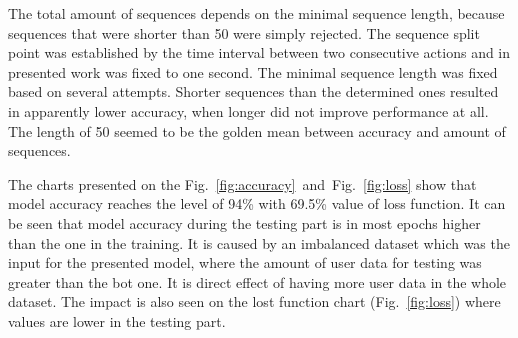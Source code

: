 The total amount of sequences depends on the minimal sequence length, because sequences that were shorter than \num{50} were simply rejected.
The sequence split point was established by the time interval between two consecutive actions and in presented work was fixed to one second.
The minimal sequence length was fixed based on several attempts.
Shorter sequences than the determined ones resulted in apparently lower accuracy, when longer did not improve performance at all.
The length of \num{50} seemed to be the golden mean between accuracy and amount of sequences.

The charts presented on the \mbox{Fig.~\ref{fig:accuracy} and Fig.~\ref{fig:loss}} show that model accuracy reaches the level of \num{94}\% with \num{69.5}\% value of loss function.
It can be seen that model accuracy during the testing part is in most epochs higher than the one in the training.
It is caused by an imbalanced dataset which was the input for the presented model, where
the amount of user data for testing was greater than the bot one.
It is direct effect of having more user data in the whole dataset.
The impact is also seen on the lost function chart \mbox{(Fig.~\ref{fig:loss})} where values are lower in the testing part.


